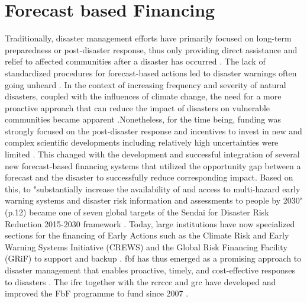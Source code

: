 \section{Forecast based Financing}\label{sec:fbf}

Traditionally, disaster management efforts have primarily focused on long-term preparedness or post-disaster response, thus only providing direct assistance and relief to affected communities after a disaster has occurred \autocite{coughlandeperezForecastbasedFinancingApproach2015,unisdrHyogoFrameworkAction2005}. The lack of standardized procedures for forecast-based actions led to disaster warnings often going unheard \autocite{kolenImpactsStormXynthia2013}. In the context of increasing frequency and severity of natural disasters, coupled with the influences of climate change, the need for a more proactive approach that can reduce the impact of disasters on vulnerable communities became apparent \autocite{coughlandeperezForecastbasedFinancingApproach2015,trisosAfrica2022}.\newline Nonetheless, for the time being, funding was strongly focused on the post-disaster response and incentives to invest in new and complex scientific developments including relatively high uncertainties were limited \autocite{coughlandeperezActionbasedFloodForecasting2016}. This changed with the development and successful integration of several new forecast-based financing systems that utilized the opportunity gap between a forecast and the disaster to successfully reduce corresponding impact. Based on this, to "substantially increase the availability of and access to multi-hazard early warning systems and disaster risk information and assessments to people by 2030" (p.12) became one of seven global targets of the Sendai for Disaster Risk Reduction 2015-2030 framework \autocites{undrrSendaiFrameworkDisaster2015}. Today, large institutions have now specialized sections for the financing of Early Actions such as the Climate Risk and Early Warning Systems Initiative (CREWS) and the Global Risk Financing Facility (GRiF) to support and backup  \autocite{crewsClimateRiskEarly,worldbankGlobalRiskFinancing}. \acrlong{fbf} has thus emerged as a promising approach to disaster management that enables proactive, timely, and cost-effective responses to disasters \autocite{coughlandeperezForecastbasedFinancingApproach2015,grcFORECASTBASEDFINANCINGInnovative2017}. The \acrfull{ifrc} together with the \acrfull{rcrccc} and \acrfull{grc} have developed and improved the FbF programme to fund  since 2007 \autocite{ifrcForecastbasedFinancingNew2019}. 

